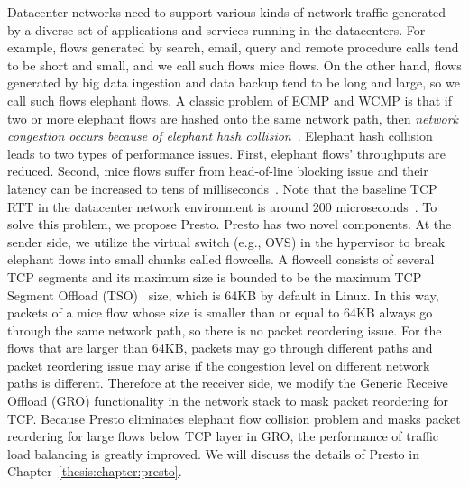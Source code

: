 Datacenter networks need to support various kinds of network traffic generated by 
a diverse set of applications and services running in the datacenters. For example, flows generated 
by search, email, query and remote procedure calls tend to be short and small, and we call such flows mice flows. 
On the other hand, flows generated by big data ingestion and data backup tend to be long and large, 
so we call such flows elephant flows. A classic problem of ECMP and WCMP is that if two or more elephant flows 
are hashed onto the same network path, then {\emph {network congestion occurs because of elephant 
hash collision}}~\cite{hedera,rasley2014planck}.
Elephant hash collision leads to two types of performance issues. First, elephant flows' throughputs are reduced. 
Second, mice flows suffer from head-of-line blocking issue and their latency can be increased to 
tens of milliseconds~\cite{alizadeh2012less}. 
Note that the baseline TCP RTT in the datacenter network environment is around 200 microseconds~\cite{he2016ac}. 
To solve this problem, we propose Presto. Presto has two novel components. At the sender side, 
we utilize the virtual switch (e.g., OVS) in the hypervisor to break elephant flows into small chunks 
called flowcells. A flowcell consists of several TCP segments and its maximum size is bounded to be the 
maximum TCP Segment Offload (TSO)~\cite{tcp-segment-offload} size, 
which is 64KB by default in Linux. In this way, packets of a mice flow whose size 
is smaller than or equal to 64KB always go through the same network path, so there is no packet reordering issue. 
For the flows that are larger than 64KB, packets may go through different paths and packet reordering 
issue may arise if the congestion level on different network paths is different. 
Therefore at the receiver side, we modify the Generic Receive Offload (GRO) functionality in the network stack to 
mask packet reordering for TCP. Because Presto eliminates elephant flow collision problem and 
masks packet reordering for large flows below TCP layer in GRO, the performance of 
traffic load balancing is greatly improved.
We will discuss the details of Presto in Chapter~\ref{thesis:chapter:presto}.


